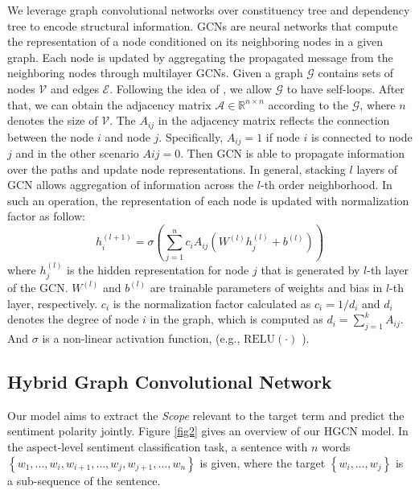 \documentclass{article}
\begin{document}
We leverage graph convolutional networks over constituency tree and dependency tree to encode structural information. GCNs are neural networks that compute the representation of a node conditioned on its neighboring nodes in a given graph. Each node is updated by aggregating the propagated message from the neighboring nodes through multilayer GCNs. Given a graph $\mathcal{G}$ contains sets of nodes $\mathcal{V}$ and edges $\mathcal{E}$. Following the idea of \cite{kipf2016semi}, we allow $\mathcal{G}$ to have self-loops. After that, we can obtain the adjacency matrix $\mathcal{A} \in \mathbb{R}^{n \times n}$ according to the $\mathcal{G}$, where $n$ denotes the size of $\mathcal{V}$. The $A_{ij}$ in the adjacency matrix reflects the connection between the node $i$ and node $j$. Specifically, $A_{ij} = 1$ if node $i$ is connected to node $j$ and in the other scenario $Aij = 0$. Then GCN is able to propagate information over the paths and update node representations. In general, stacking $l$ layers of GCN allows aggregation of information across the $l$-th order neighborhood. In such an operation, the representation of each node is updated with normalization factor as follow:
\begin{equation}
	h_{i}^{(l+1)}= \sigma \left(\sum_{j=1}^{n} c_{i} A_{i j}\left(W^{(l)} h_{j}^{(l)}+b^{(l)}\right)\right) \label{eq1}
\end{equation}
where $h_{j}^{(l)}$ is the hidden representation for node $j$ that is generated by $l$-th layer of the GCN. $W^{(l)}$ and $b^{(l)}$ are trainable parameters of weights and bias in $l$-th layer, respectively. $c_i$ is the normalization factor calculated as $c_i = 1 / d_i$ and $d_i$ denotes the degree of node $i$ in the graph, which is computed as $d_{i}=\sum_{j=1}^{k} A_{i j} $. And $\sigma$ is a non-linear activation function, (e.g., $\text{RELU} (\cdot)$ \cite{glorot2011deep}).

\subsection{Hybrid Graph Convolutional Network}

Our model aims to extract the \emph{Scope} relevant to the target term and predict the sentiment polarity jointly. Figure \ref{fig2} gives an overview of our HGCN model. In the aspect-level sentiment classification task, a sentence with $n$ words $\left\{w_{1}, \ldots, w_{i}, w_{i+1}, \ldots, w_{j}, w_{j+1}, \ldots, w_{n}\right\}$ is given, where the target $\left\{w_{i}, \ldots, w_{j}\right\}$ is a sub-sequence of the sentence.
\end{document}
